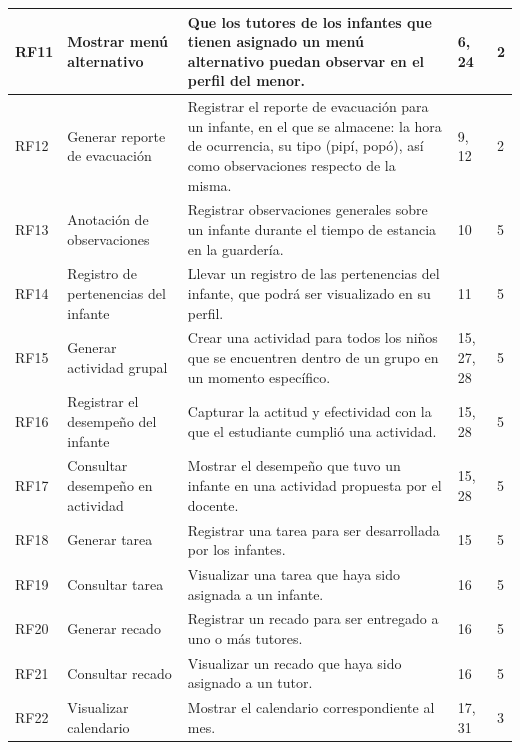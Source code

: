 \documentclass{article}
\begin{document}
\begin{longtable}{|p{1.0cm}|p{3.0cm}|p{5.0cm}|p{1.2cm}|p{0.75cm}|}
	RF11 &
	Mostrar menú alternativo &
	Que los tutores de los infantes que tienen asignado un menú alternativo puedan observar en el perfil del menor. &
	6, 24 & 
	 2
	\\ \hline

	RF12 &
	Generar reporte de evacuación &
	Registrar el reporte de evacuación para un infante, en el que se almacene: la hora de ocurrencia, su tipo (pipí, popó), así como observaciones respecto de la misma. &
	9, 12 & 
	 2
	\\ \hline

	RF13 &
	Anotación de observaciones &
	Registrar observaciones generales sobre un infante durante el tiempo de estancia en la guardería. &
	10 & 
	 5
	\\ \hline

	RF14 &
	Registro de pertenencias del infante &
	Llevar un registro de las pertenencias del infante, que podrá ser visualizado en su perfil. &
	11 & 
	 5
	\\ \hline

	RF15 &
	Generar actividad grupal &
	Crear una actividad para todos los niños que se encuentren dentro de un grupo en un momento específico. &
	15, 27, 28 & 
	 5
	\\ \hline

	RF16 &
	Registrar el desempeño del infante &
	Capturar la actitud y efectividad con la que el estudiante cumplió una actividad. &
	15, 28 & 
	 5
	\\ \hline

	RF17 &
	Consultar desempeño en actividad &
	Mostrar el desempeño que tuvo un infante en una actividad propuesta por el docente. &
	15, 28 & 
	 5
	\\ \hline

	RF18 &
	Generar tarea &
	Registrar una tarea para ser desarrollada por los infantes. &
	15 & 
	 5
	\\ \hline

	RF19 &
	Consultar tarea &
	Visualizar una tarea que haya sido asignada a un infante. &
	16 & 
	 5
	\\ \hline

	RF20 &
	Generar recado &
	Registrar un recado para ser entregado a uno o más tutores. &
	16 & 
	 5
	\\ \hline

	RF21 &
	Consultar recado &
	Visualizar un recado que haya sido asignado a un tutor. &
	16 & 
	 5
	\\ \hline

	RF22 &
	Visualizar calendario &
	Mostrar el calendario correspondiente al mes. &
	17, 31 & 
	 3
	\\ \hline


\end{longtable}
\end{document}

